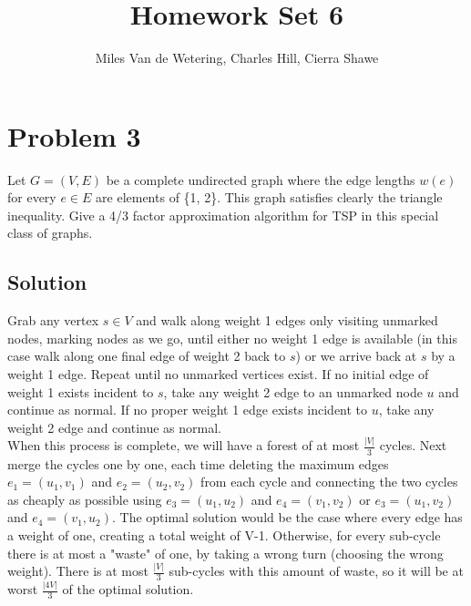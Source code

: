 \documentclass[]{article}
\title{Homework Set 6}
\author{Miles Van de Wetering, Charles Hill, Cierra Shawe}
\begin{document}
	\maketitle
	
\section*{Problem 3}
Let $G = (V, E)$ be a complete undirected graph where the edge lengths $w(e)$ for every $e \in E$ are elements of \{1, 2\}. This graph satisfies clearly the triangle inequality. Give a 4/3 factor approximation algorithm for TSP in this special class of graphs.

\subsection*{Solution}
Grab any vertex $s \in V$ and walk along weight 1 edges only visiting unmarked nodes, marking nodes as we go, until either no weight 1 edge is available (in this case walk along one final edge of weight 2 back to $s$) or we arrive back at $s$ by a weight 1 edge. Repeat until no unmarked vertices exist. If no initial edge of weight 1 exists incident to $s$, take any weight 2 edge to an unmarked node $u$ and continue as normal. If no proper weight 1 edge exists incident to $u$, take any weight 2 edge and continue as normal. \\
When this process is complete, we will have a forest of at most $\frac{|V|}{3}$ cycles. Next merge the cycles one by one, each time deleting the maximum edges $e_1 = (u_1, v_1)$ and $e_2 = (u_2, v_2)$ from each cycle and connecting the two cycles as cheaply as possible using $e_3 = (u_1, u_2)$ and $e_4 = (v_1, v_2)$ or $e_3 = (u_1, v_2)$ and $e_4 = (v_1, u_2)$.
The optimal solution would be the case where every edge has a weight of one, creating a total weight of V-1. Otherwise, for every sub-cycle there is at most a "waste" of one, by taking a wrong turn (choosing the wrong weight). There is at most $\frac{|V|}{3}$ sub-cycles with this amount of waste, so it will be at worst $\frac{|4V|}{3}$ of the optimal solution. \\
\end{document}
